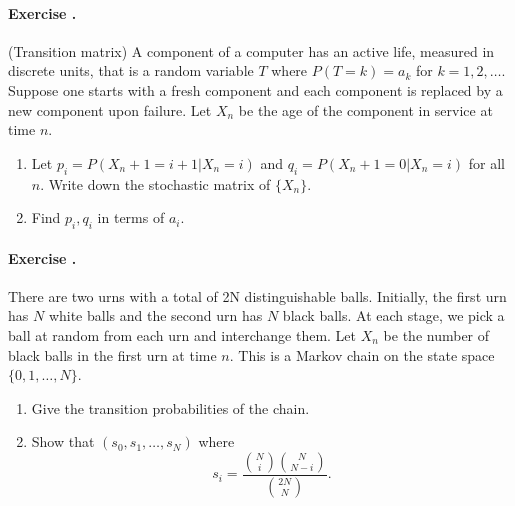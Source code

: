 \documentclass[12pt,a4paper]{article}
\newcounter{num}  %
\begin{document}
	
	\paragraph{Exercise \thenum.} (Transition matrix)
		A component of a computer has an active life, measured in discrete units, that is a random variable $T$ where
		$P (T = k) = a_k$ for $k = 1, 2,\ldots$. 
		Suppose one starts with a fresh component and each component is replaced by a new component upon failure. Let $X_n$ be the age of the component in service at time $n$.
		\begin{enumerate}
			\item Let $p_i = P(X_n+1 = i + 1 | X_n = i)$ and $q_i = P (X_n+1 = 0 | X_n = i)$ for all $n$. 
			Write down the stochastic matrix of $\{X_n\}$.
			\item Find $p_i, q_i$ in terms of $a_i$.
		\end{enumerate}
	
	
	\paragraph{Exercise \thenum.}
	There are two urns with a total of 2N distinguishable balls. Initially, the first urn has $N$ white balls and the second urn has $N$ black balls. At each stage, we pick a ball at random from each urn and interchange them. Let $X_n$ be the number of black balls in the first urn at time $n$. 
	This is a Markov chain on the state space $\{0, 1,\ldots, N \}$.
	\begin{enumerate}
		\item Give the transition probabilities of the chain.
		\item Show that $(s_0, s_1,\ldots, s_N)$ where
		\begin{equation}
			s_i = \frac{\binom{N}{i}\binom{N}{N-i}}{\binom{2N}{N}}.
		\end{equation}
		\end{enumerate}
	
\end{document}
